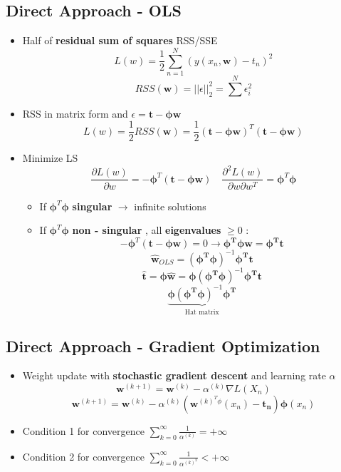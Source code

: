 \documentclass[12pt]{article} %
\begin{document}
\subsection{Direct Approach - OLS}
\begin{itemize}
\item Half of \textbf{residual sum of squares} RSS/SSE 
$$ L(w) = \frac{1}{2} \sum \limits_{n=1}^{N} (y(x_n , \bm{w}) -t_n)^2$$
$$ RSS(\bm{w}) = || \epsilon||^2_2 = \sum \limits^N \epsilon_i^2$$

\item RSS in matrix form and $\epsilon = \bm{t} -\bm{\phi w}$
$$ L(w)  = \frac{1}{2} RSS(\bm{w}) = \frac{1}{2}( \bm{t} - \bm{\phi w})^T(\bm{t} - \bm{\phi w})$$

\item Minimize LS 
$$ \frac{\partial L(w)}{\partial w} = - \bm{\phi}^T(\bm{t} - \bm{\phi w}) \quad 
   \frac{\partial^2 L(w)}{\partial w \partial w^T} = \bm{\phi}^T \bm{\phi} $$

\begin{itemize}
\item If $\bm{\phi}^T \bm{\phi}$ \textbf{singular} $\rightarrow$ infinite solutions
\item If $\bm{\phi}^T \bm{\phi}$ \textbf{non - singular} , all \textbf{eigenvalues} $ \geq 0 $ :
$$ - \bm{\phi}^T(\bm{t}- \bm{\phi w}) = 0 \rightarrow \bm{\phi ^T \phi w} = \bm{\phi^T t} $$
$$ \hat{\bm{w}}_{OLS} = (\bm{\phi^T \phi })^{-1} \bm{\phi^T t}$$
$$ \hat{\bm{t}} = \bm{\phi \hat{w}} = \bm{\phi (\phi^T \phi)}^{-1} \bm{\phi^T t}$$
\[\underbrace{\bm{\phi (\phi^T \phi)}^{-1} \bm{\phi^T}}_{\text{Hat matrix}} \]
\end{itemize}
\end{itemize}

\subsection{Direct Approach - Gradient Optimization}
\begin{itemize}
\item Weight update with \textbf{stochastic gradient descent} and learning rate $\alpha$
$$ \bm{w}^{(k+1)} = \bm{w}^{(k)} - \alpha^{(k)}\nabla L(X_n)$$
$$ \bm{w}^{(k+1)} = \bm{w}^{(k)} - \alpha^{(k)} (\bm{w}^{(k)^T \phi}(x_n) - \bm{t_n}) \bm{\phi}(x_n)$$

\item Condition 1 for convergence $\sum \limits_{k=0}^{\infty} \frac{1}{\alpha^{(k)}} = + \infty$
\item Condition 2 for convergence $\sum \limits_{k=0}^{\infty} \frac{1}{\alpha^{(k)^2}} < + \infty$
\end{itemize}
\end{document}
